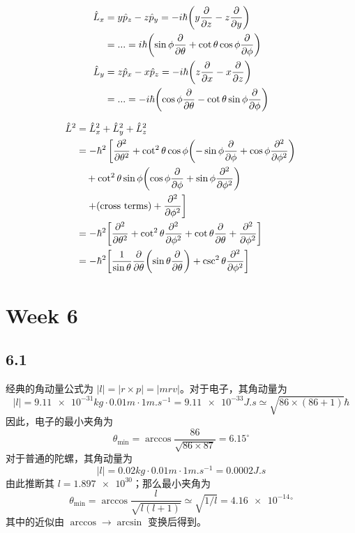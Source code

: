 \begin{align}\label{key}
\hat L_x &= y \hat p_z - z \hat p_y = -i\hbar \qty(y \pdv{z} - z\pdv{y}) \notag\\
&= ... = i\hbar \qty(\sin\phi \pdv{\theta} + \cot\theta\cos\phi\pdv{\phi}) \\
\hat L_y &= z \hat p_x - x \hat p_z = -i\hbar \qty(z \pdv{x} - x\pdv{z}) \notag\\
&= ... = -i\hbar \qty(\cos\phi \pdv{\theta} - \cot\theta\sin\phi\pdv{\phi}) 
\end{align}

\begin{align}
\hat L^2 &= \hat L_x^2 + \hat L_y^2 + \hat L_z^2 \notag\\
&= -\hbar^2 \left[\pdv[2]{\theta} + \cot^2\theta \cos\phi \qty(-\sin\phi\pdv{\phi} + \cos\phi\pdv[2]{\phi})  \right. \notag\\
&{}\quad + \cot^2\theta \sin\phi \qty(\cos\phi\pdv{\phi} + \sin\phi\pdv[2]{\phi}) \notag\\
& {}\quad \left. + (\text{cross terms}) + \pdv[2]{\phi} \right] \notag\\
&= -\hbar^2 \qty[\pdv[2]{\theta} + \cot^2\theta \pdv[2]{\phi} + \cot\theta\pdv\theta + \pdv[2]{\phi} ] \notag\\
&= -\hbar^2 \qty[\dfrac{1}{\sin\theta}\pdv{\theta}\qty(\sin\theta\pdv{\theta})  + \csc^2\theta \pdv[2]{\phi}  ]
\end{align}

\section{Week 6}
\subsection{6.1}
经典的角动量公式为 $|l| = |r \times p| = |m r v|$。对于电子，其角动量为
\begin{equation*}
|l| = \num{9.11e-31} \si{kg} \cdot \num{0.01} \si{m} \cdot \num{1} \si{m.s^{-1}} = \num{9.11e-33} \si{J.s} \simeq \sqrt{86 \times (86+1)} \hbar
\end{equation*}
因此，电子的最小夹角为
\begin{equation*}
\theta_\mathrm{min} = \arccos \frac{86}{\sqrt{86 \times 87}} = 6.15^\circ
\end{equation*}
对于普通的陀螺，其角动量为
\begin{equation*}
|l| = \num{0.02} \si{kg} \cdot \num{0.01} \si{m} \cdot \num{1} \si{m.s^{-1}}= \num{0.0002} \si{J.s}
\end{equation*}
由此推断其 $l = \num{1.897e30}$；那么最小夹角为
\begin{equation*}
\theta_\mathrm{min} = \arccos \frac{l}{\sqrt{l (l + 1)}} \simeq \sqrt{1/l} = \num{4.16e-14} {}^\circ
\end{equation*}
其中的近似由 $\arccos \rightarrow \arcsin$ 变换后得到。

